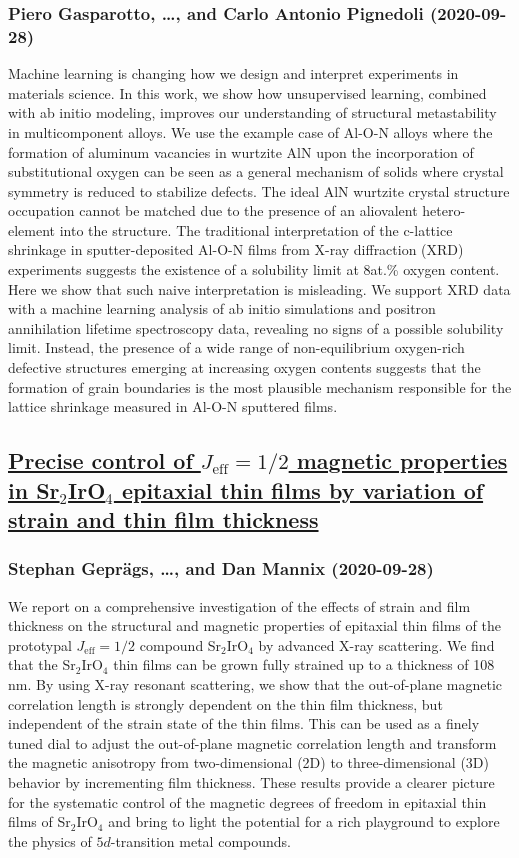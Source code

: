 \subsubsection*{Piero Gasparotto, \dots, and Carlo Antonio Pignedoli (2020-09-28)}
Machine learning is changing how we design and interpret experiments in
materials science. In this work, we show how unsupervised learning, combined
with ab initio modeling, improves our understanding of structural metastability
in multicomponent alloys. We use the example case of Al-O-N alloys where the
formation of aluminum vacancies in wurtzite AlN upon the incorporation of
substitutional oxygen can be seen as a general mechanism of solids where
crystal symmetry is reduced to stabilize defects. The ideal AlN wurtzite
crystal structure occupation cannot be matched due to the presence of an
aliovalent hetero-element into the structure. The traditional interpretation of
the c-lattice shrinkage in sputter-deposited Al-O-N films from X-ray
diffraction (XRD) experiments suggests the existence of a solubility limit at
8at.\% oxygen content. Here we show that such naive interpretation is
misleading. We support XRD data with a machine learning analysis of ab initio
simulations and positron annihilation lifetime spectroscopy data, revealing no
signs of a possible solubility limit. Instead, the presence of a wide range of
non-equilibrium oxygen-rich defective structures emerging at increasing oxygen
contents suggests that the formation of grain boundaries is the most plausible
mechanism responsible for the lattice shrinkage measured in Al-O-N sputtered
films.

\subsection*{\href{http://arxiv.org/abs/2009.13185v1}{Precise control of $J_\mathrm{eff}=1/2$ magnetic properties in  Sr$_2$IrO$_4$ epitaxial thin films by variation of strain and thin film  thickness}}
\subsubsection*{Stephan Geprägs, \dots, and Dan Mannix (2020-09-28)}
We report on a comprehensive investigation of the effects of strain and film
thickness on the structural and magnetic properties of epitaxial thin films of
the prototypal $J_\mathrm{eff}=1/2$ compound Sr$_2$IrO$_4$ by advanced X-ray
scattering. We find that the Sr$_2$IrO$_4$ thin films can be grown fully
strained up to a thickness of 108 nm. By using X-ray resonant scattering, we
show that the out-of-plane magnetic correlation length is strongly dependent on
the thin film thickness, but independent of the strain state of the thin films.
This can be used as a finely tuned dial to adjust the out-of-plane magnetic
correlation length and transform the magnetic anisotropy from two-dimensional
(2D) to three-dimensional (3D) behavior by incrementing film thickness. These
results provide a clearer picture for the systematic control of the magnetic
degrees of freedom in epitaxial thin films of Sr$_2$IrO$_4$ and bring to light
the potential for a rich playground to explore the physics of $5d$-transition
metal compounds.

